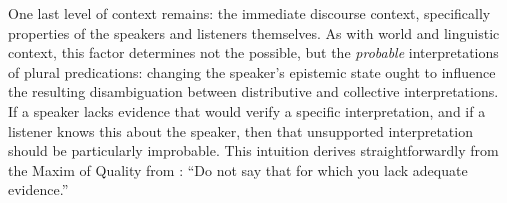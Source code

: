 \documentclass[linguex]{sp}
\begin{document}
One last level of context remains: the immediate discourse context, specifically properties of the speakers and listeners themselves. As with world and linguistic context, this factor determines not the possible, but the \emph{probable} interpretations of plural predications: changing the speaker's epistemic state ought to influence the resulting disambiguation between distributive and collective interpretations. 
If a speaker lacks evidence that would verify a specific interpretation, and if a listener knows this about the speaker, then that unsupported interpretation should be particularly improbable. This intuition derives straightforwardly from the Maxim of Quality from \cite{grice1975}: ``Do not say that for which you lack adequate evidence.'' 
\end{document}
